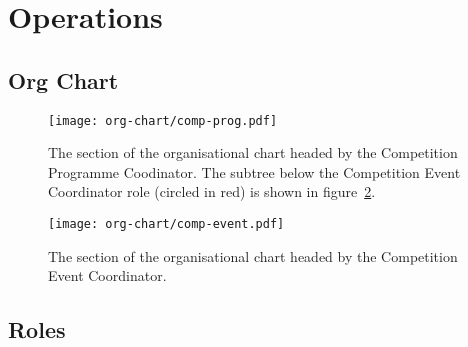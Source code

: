 \section{Operations}
\label{sec:comp-prog-ops}

\subsection{Org Chart}
\begin{landscape}
  \begin{figure}
    \begin{center}
      \texttt{[image: org-chart/comp-prog.pdf]}
    \end{center}
    \caption{\label{fig:org-chart-prog}The section of the organisational chart headed by the Competition Programme Coodinator.  The subtree below the Competition Event Coordinator role (circled in red) is shown in figure~\ref{fig:org-chart-event}.}
  \end{figure}
\end{landscape}

\begin{landscape}
  \begin{figure}
    \begin{center}
      \texttt{[image: org-chart/comp-event.pdf]}
    \end{center}
    \caption{\label{fig:org-chart-event}The section of the organisational chart headed by the Competition Event Coordinator.}
  \end{figure}
\end{landscape}

\subsection{Roles}



